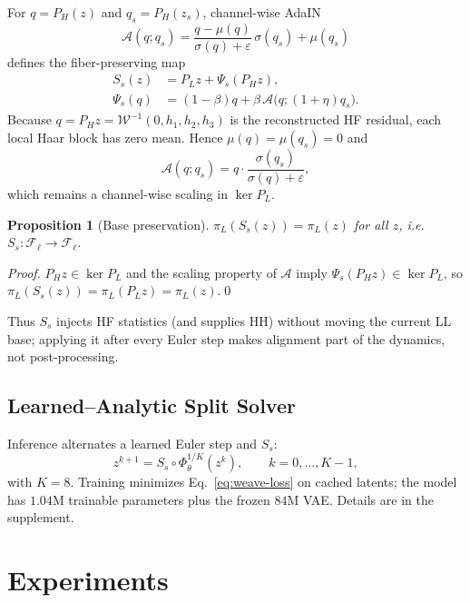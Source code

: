 \documentclass[letterpaper]{article} %
\newtheorem{proposition}{Proposition}
\begin{document}
For $q{=}P_H(z)$ and $q_s{=}P_H(z_s)$, channel-wise AdaIN~\cite{huang2017arbitrary}
\begin{equation}
\mathcal A(q;q_s)=
\frac{q-\mu(q)}{\sigma(q)+\varepsilon}\,\sigma(q_s)+\mu(q_s)
\label{eq:spatial-fiber-adain}
\end{equation}
defines the fiber-preserving map
\begin{equation}
\begin{aligned}
S_s(z)&=P_L z+\Psi_s(P_H z),\\
\Psi_s(q)&=(1-\beta)q+\beta\,\mathcal A\!\bigl(q;(1+\eta)q_s\bigr).
\end{aligned}
\label{eq:fiber-operator}
\end{equation}
Because $q=P_Hz=\mathcal W^{-1}(0,h_1,h_2,h_3)$ is the reconstructed HF residual, each local Haar block has zero mean. Hence $\mu(q)=\mu(q_s)=0$ and
\[
\mathcal A(q;q_s)
=
q\cdot\frac{\sigma(q_s)}{\sigma(q)+\varepsilon},
\]
which remains a channel-wise scaling in $\ker P_L$.

\begin{proposition}[Base preservation]
\label{prop:base-preserve}
$\pi_L(S_s(z))=\pi_L(z)$ for all $z$, i.e.\ $S_s:\mathcal F_\ell\to\mathcal F_\ell$.
\end{proposition}
\begin{proof}
$P_H z\in\ker P_L$ and the scaling property of $\mathcal A$ imply
$\Psi_s(P_H z)\in\ker P_L$, so
$\pi_L(S_s(z))=\pi_L(P_L z)=\pi_L(z)$.\qed
\end{proof}
Thus $S_s$ injects HF statistics (and supplies HH) without moving the current LL base;
applying it after every Euler step makes alignment part of the dynamics, not post-processing.

\subsection{Learned--Analytic Split Solver}
\label{sec:efficiency}

Inference alternates a learned Euler step and $S_s$:
\begin{equation}
z^{k+1}=S_s\circ\Phi_\theta^{1/K}(z^k),\qquad k=0,\dots,K-1,
\label{eq:split-solver}
\end{equation}
with $K{=}8$. Training minimizes Eq.~\ref{eq:weave-loss} on cached latents; the model has
$1.04$M trainable parameters plus the frozen $84$M VAE. Details are in the supplement.



\section{Experiments}
\label{sec:exp}
\end{document}
